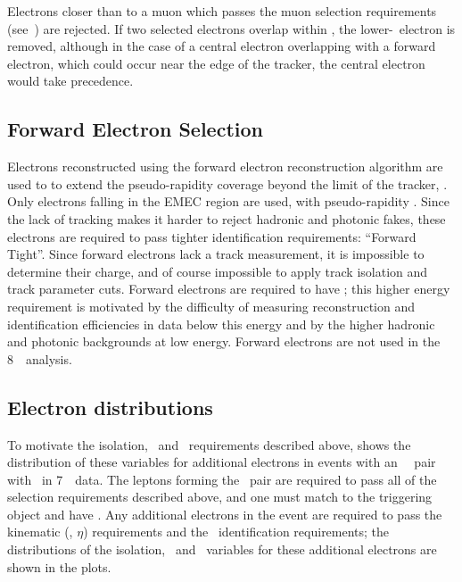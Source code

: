 Electrons closer than  to a muon which passes the muon selection
requirements (see~) are rejected. If two selected electrons
overlap within , the lower-\et\ electron is removed, although in
the case of a central electron overlapping with a forward electron, which could
occur near the edge of the tracker, the central electron would take precedence.

\subsection{Forward Electron Selection}

Electrons reconstructed using the forward electron reconstruction algorithm are
used to to extend the pseudo-rapidity coverage beyond the limit of the tracker,
. Only electrons falling in the EMEC region are used, with
pseudo-rapidity .  Since the lack of tracking makes it
harder to reject hadronic and photonic fakes, these electrons are required to
pass tighter identification requirements: ``Forward Tight''. Since forward
electrons lack a track measurement, it is impossible to determine their charge,
and of course impossible to apply track isolation and track parameter cuts.
Forward electrons are required to have ; this higher energy requirement
is motivated by the difficulty of measuring reconstruction and identification
efficiencies in data below this energy and by the higher hadronic and photonic
backgrounds at low energy.
Forward electrons are not used in the 8~\tev\ analysis.

\subsection{Electron distributions}

To motivate the isolation, \dzerosig\ and \zzero\ requirements described
above,  shows the distribution of these variables for additional
electrons in events with an \ossf\ \dilepton\ pair with \sstooos\ in 7~\tev\ data. 
The leptons forming the \dilepton\ pair are required to pass all of
the selection requirements described above, and one must match to the triggering
object and have . Any additional electrons in the event are required to pass
the kinematic (\pt, $\eta$) requirements and the \loosePP\ identification
requirements; the distributions of the isolation, \dzerosig\ and \zzero\
variables for these additional electrons are shown in the plots. 

